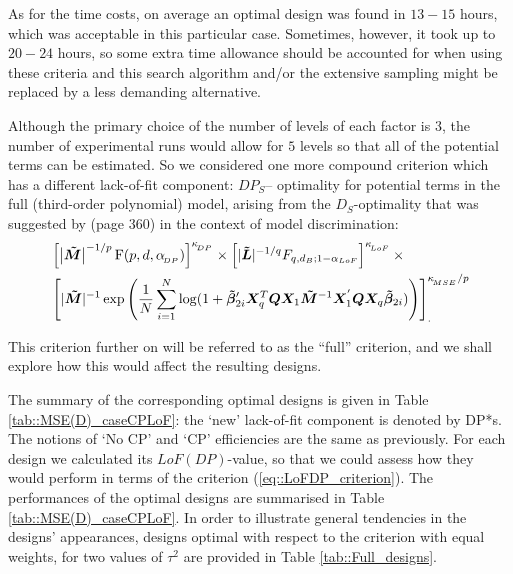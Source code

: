 As for the time costs, on average an optimal design was found in $13-15$ hours, which was acceptable in this particular case. Sometimes, however, it took up to $20-24$ hours, so some extra time allowance should be accounted for when using these criteria and this search algorithm and/or the extensive sampling might be replaced by a less demanding alternative. 


Although the primary choice of the number of levels of each factor is $3$, the number of experimental runs would allow for $5$ levels so that all of the potential terms can be estimated. So we considered one more compound criterion which has a different lack-of-fit component: $DP_S$-- optimality for potential terms in the full (third-order polynomial) model, arising from the $D_S$-optimality that was suggested by \cite{Atkinson2007} (page $360$) in the context of model discrimination:
\begin{align}
\label{eq::crit2}
&\left[\left|\bm{\tilde{M}}\right|^{-1/p}\mathrm{F}(p,d,\alpha_{\!_{DP}})\right]^{\kappa_{\!_{DP}}} \times  \left[|\bm{\tilde{L}}|^{-1/q}F_{q,d_B;1-\alpha_{LoF}}\right]^{\kappa_{\!_{LoF}}}\times \notag\\ & \left[|\bm{\tilde{M}}|^{-1}\exp\left(\frac{1}{N}\sum_{i=1}^{N}\log(1+\bm{\tilde{\beta}}_{2i}'\bm{X}_q^{T}\bm{Q}\bm{X}_1\bm{\tilde{M}}^{-1}\bm{X}_1^{'}\bm{Q}\bm{X}_q\bm{\tilde{\beta}}_{2i})\right)\right]_{.}^{\kappa_{\!_{MSE}}/p}
\end{align}

This criterion further on will be referred to as the ``full'' criterion, and we shall explore how this would affect the resulting designs.

The summary of the corresponding optimal designs is given in Table \ref{tab::MSE(D)_caseCPLoF}: the `new' lack-of-fit component is denoted by DP*s. The notions of `No CP'  and `CP' efficiencies are the same as previously. For each design we calculated its $LoF(DP)$-value, so that we could assess how they would perform in terms of the criterion (\ref{eq::LoFDP_criterion}). The performances of the optimal designs are summarised in Table \ref{tab::MSE(D)_caseCPLoF}. In order to illustrate general tendencies in the designs' appearances, designs optimal with respect to the criterion with equal weights, for two values of $\tau^2$ are provided in Table \ref{tab::Full_designs}.

